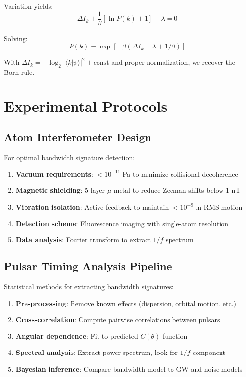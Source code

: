 \documentclass[twocolumn,prd,amsmath,amssymb,aps,superscriptaddress,nofootinbib]{revtex4-2}
\begin{document}
Variation yields:
\begin{equation}
\Delta I_k + \frac{1}{\beta}[\ln P(k) + 1] - \lambda = 0
\end{equation}

Solving:
\begin{equation}
P(k) = \exp[-\beta(\Delta I_k - \lambda + 1/\beta)]
\end{equation}

With $\Delta I_k = -\log_2|\langle k|\psi\rangle|^2 + \text{const}$ and proper normalization, we recover the Born rule.

\section{Experimental Protocols}
\label{app:protocols}

\subsection{Atom Interferometer Design}

For optimal bandwidth signature detection:

\begin{enumerate}
\item \textbf{Vacuum requirements}: $< 10^{-11}$ Pa to minimize collisional decoherence
\item \textbf{Magnetic shielding}: 5-layer $\mu$-metal to reduce Zeeman shifts below 1 nT
\item \textbf{Vibration isolation}: Active feedback to maintain $< 10^{-9}$ m RMS motion
\item \textbf{Detection scheme}: Fluorescence imaging with single-atom resolution
\item \textbf{Data analysis}: Fourier transform to extract $1/f$ spectrum
\end{enumerate}

\subsection{Pulsar Timing Analysis Pipeline}

Statistical methods for extracting bandwidth signatures:

\begin{enumerate}
\item \textbf{Pre-processing}: Remove known effects (dispersion, orbital motion, etc.)
\item \textbf{Cross-correlation}: Compute pairwise correlations between pulsars
\item \textbf{Angular dependence}: Fit to predicted $C(\theta)$ function
\item \textbf{Spectral analysis}: Extract power spectrum, look for $1/f$ component
\item \textbf{Bayesian inference}: Compare bandwidth model to GW and noise models
\end{enumerate}
\end{document}
